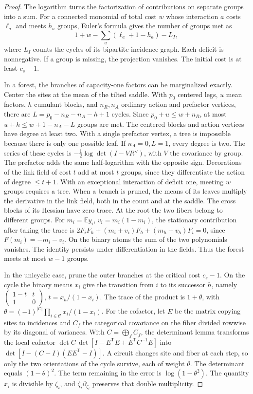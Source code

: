\begin{proof}
The logarithm turns the factorization of contributions on separate groups into a sum. For a connected
monomial of total cost \(w\) whose interaction \(a\) costs \(\ell_a\) and meets \(h_a\) groups, Euler's
formula gives the number of groups met as
\[
 1+w-\sum_a(\ell_a+1-h_a)-L_I ,
\]
where \(L_I\) counts the cycles of its bipartite incidence graph. Each deficit is nonnegative. If a group
is missing, the projection vanishes. The initial cost is at least \(c_s-1\).

In a forest, the branches of capacity-one factors can be marginalized exactly. Center the sites at the
mean of the tilted saddle. With \(p_0\) centered legs, \(u\) mean factors, \(h\) cumulant blocks, and
\(n_R,n_A\) ordinary action and prefactor vertices, there are \(L=p_0-n_R-n_A-h+1\) cycles. Since
\(p_0+u\le w+n_R\), at most \(u+h\le w+1-n_A-L\) groups are met. The centered blocks and action vertices
have degree at least two. With a single prefactor vertex, a tree is impossible because there is only one
possible leaf. If \(n_A=0,L=1\), every degree is two. The series of these cycles is
\(-\tfrac12\log\det(I-VR'')\), with \(V\) the covariance by group. The prefactor adds the same
half-logarithm with the opposite sign. Decorations of the link field of cost \(t\) add at most \(t\)
groups, since they differentiate the action of degree \(\le t+1\). With an exceptional interaction of
deficit one, meeting \(w\) groups requires a tree. When a branch is pruned, the means of its leaves
multiply the derivative in the link field, both in the count and at the saddle. The cross blocks of its
Hessian have zero trace. At the root the two fibers belong to different groups. For \(m_i=\mathbb Ey_i\),
\(v_i=m_i(1-m_i)\), the stationary contribution after taking the trace is
\(2F_iF_h+(m_i+v_i)F_h+(m_h+v_h)F_i=0\), since \(F(m_i)=-m_i-v_i\). On the binary atoms the sum of the
two polynomials vanishes. The identity persists under differentiation in the fields. Thus the forest
meets at most \(w-1\) groups.

In the unicyclic case, prune the outer branches at the critical cost \(c_s-1\). On the cycle the binary
means \(x_i\) give the transition from \(i\) to its successor \(h\), namely
\(\left(\begin{smallmatrix}1-t&t\\1&0\end{smallmatrix}\right)\), \(t=x_h/(1-x_i)\). The trace of the
product is \(1+\theta\), with \(\theta=(-1)^{|\mathcal C|}\prod_{i\in\mathcal C}x_i/(1-x_i)\). For the
cofactor, let \(E\) be the matrix copying sites to incidences and \(C_f\) the categorical covariance on
the fiber divided rowwise by its diagonal of variances. With \(C=\bigoplus_f C_f\), the determinant lemma
transforms the local cofactor \(\det C\,\det[I-E^{\mathsf T}E+E^{\mathsf T}C^{-1}E]\) into
\(\det[I-(C-I)(EE^{\mathsf T}-I)]\). A circuit changes site and fiber at each step, so only the two
orientations of the cycle survive, each of weight \(\theta\). The determinant equals \((1-\theta)^2\).
The term remaining in the error is \(\log(1-\theta^2)\). The quantity \(x_i\) is divisible by
\(\zeta_i\), and \(\zeta_i\partial_{\zeta_i}\) preserves that double multiplicity.


\end{proof}
